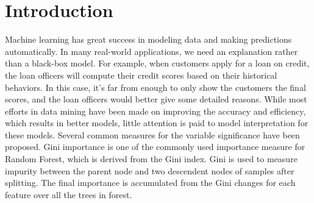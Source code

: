 \section{Introduction}
Machine learning has great success in modeling data and making predictions
automatically.
In many real-world applications, we need an explanation rather than
a black-box model.
For example,  when customers apply for a loan on credit, 
the loan officers will compute their credit scores  
based on their historical behaviors. In this case, it's far from enough to 
only show the customers the final scores, and the loan officers would better
give some detailed reasons. 
%
%
While most efforts in data mining have been made on improving the accuracy 
and efficiency, which results in better models, little attention is paid to 
model interpretation for these models.
Several common measures for the variable significance have been proposed. 
Gini importance is one of the commonly used importance measure for Random Forest, 
which is derived from the Gini index\cite{breiman2001random}. 
Gini is used to measure impurity between the parent node and
two descendent nodes of samples after splitting. 
The final importance is accumulated from the Gini changes for each feature 
over all the trees in forest. 
